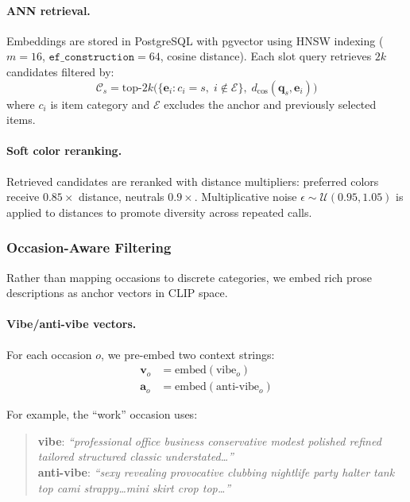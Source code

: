 \documentclass[10pt,twocolumn]{article}
\begin{document}
\paragraph{ANN retrieval.}
Embeddings are stored in PostgreSQL with pgvector using HNSW indexing
($m{=}16$, $\texttt{ef\_construction}{=}64$, cosine distance).  Each slot
query retrieves $2k$ candidates filtered by:
\begin{equation}
  \mathcal{C}_s = \text{top-}2k\big(
    \{\mathbf{e}_i : c_i = s, \; i \notin \mathcal{E}\},\;
    d_{\cos}(\mathbf{q}_s, \mathbf{e}_i)
  \big)
\end{equation}
where $c_i$ is item category and $\mathcal{E}$ excludes the anchor and
previously selected items.

\paragraph{Soft color reranking.}
Retrieved candidates are reranked with distance multipliers:
preferred colors receive $0.85\times$ distance, neutrals $0.9\times$.
Multiplicative noise $\epsilon \sim \mathcal{U}(0.95, 1.05)$ is applied to
distances to promote diversity across repeated calls.

\subsubsection{Occasion-Aware Filtering}
\label{sec:occasion}

Rather than mapping occasions to discrete categories, we embed rich prose
descriptions as anchor vectors in CLIP space.

\paragraph{Vibe/anti-vibe vectors.}
For each occasion $o$, we pre-embed two context strings:
\begin{align}
  \mathbf{v}_o &= \text{embed}(\text{vibe}_o) \\
  \mathbf{a}_o &= \text{embed}(\text{anti-vibe}_o)
\end{align}

For example, the ``work'' occasion uses:
\begin{quote}
\small
\textbf{vibe}: \textit{``professional office business conservative modest
polished refined tailored structured classic understated\ldots''}\\
\textbf{anti-vibe}: \textit{``sexy revealing provocative clubbing nightlife
party halter tank top cami strappy\ldots mini skirt crop top\ldots''}
\end{quote}
\end{document}
